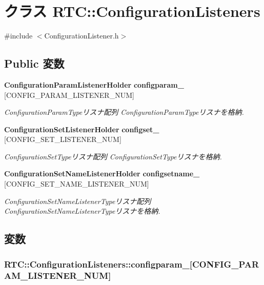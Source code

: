\section{クラス RTC::ConfigurationListeners}
\label{classRTC_1_1ConfigurationListeners}


{\ttfamily \#include $<$ConfigurationListener.h$>$}

\subsection*{Public 変数}
\begin{DoxyCompactItemize}
\item 
{\bf ConfigurationParamListenerHolder} {\bf configparam\_\-} [CONFIG\_\-PARAM\_\-LISTENER\_\-NUM]
\begin{DoxyCompactList}\small\item\em ConfigurationParamTypeリスナ配列 ConfigurationParamTypeリスナを格納. \item\end{DoxyCompactList}\item 
{\bf ConfigurationSetListenerHolder} {\bf configset\_\-} [CONFIG\_\-SET\_\-LISTENER\_\-NUM]
\begin{DoxyCompactList}\small\item\em ConfigurationSetTypeリスナ配列 ConfigurationSetTypeリスナを格納. \item\end{DoxyCompactList}\item 
{\bf ConfigurationSetNameListenerHolder} {\bf configsetname\_\-} [CONFIG\_\-SET\_\-NAME\_\-LISTENER\_\-NUM]
\begin{DoxyCompactList}\small\item\em ConfigurationSetNameListenerTypeリスナ配列 ConfigurationSetNameListenerTypeリスナを格納. \item\end{DoxyCompactList}\end{DoxyCompactItemize}


\subsection{変数}
\subsubsection[{configparam\_\-}]{ {\bf RTC::ConfigurationListeners::configparam\_\-}[CONFIG\_\-PARAM\_\-LISTENER\_\-NUM]}\label{classRTC_1_1ConfigurationListeners_a4b5c4442f95009363213b81d0d082a19}


